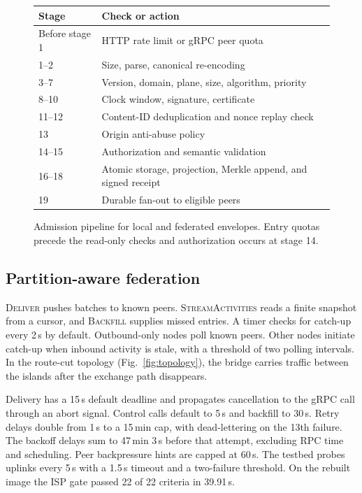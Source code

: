 \documentclass[conference,a4paper,10pt]{IEEEtran}
\begin{document}
\begin{figure}[!t]
  \centering
  {\normalsize
  \begin{tabularx}{\columnwidth}{@{}l>{\raggedright\arraybackslash}X@{}}
    \toprule
    \textbf{Stage} & \textbf{Check or action} \\
    \midrule
    Before stage 1 & HTTP rate limit or gRPC peer quota \\
    \midrule
    1--2 & Size, parse, canonical re-encoding \\
    3--7 & Version, domain, plane, size, algorithm, priority \\
    8--10 & Clock window, signature, certificate \\
    11--12 & Content-ID deduplication and nonce replay check \\
    \midrule
    13 & Origin anti-abuse policy \\
    14--15 & Authorization and semantic validation \\
    16--18 & Atomic storage, projection, Merkle append, and signed receipt \\
    19 & Durable fan-out to eligible peers \\
    \bottomrule
  \end{tabularx}}
  \caption{Admission pipeline for local and federated envelopes. Entry quotas precede the read-only checks and authorization occurs at stage 14.}
  \label{fig:pipeline}
\end{figure}

\subsection{Partition-aware federation}

\textsc{Deliver} pushes batches to known peers. \textsc{StreamActivities} reads a finite snapshot from a cursor, and \textsc{Backfill} supplies missed entries. A timer checks for catch-up every 2\,s by default. Outbound-only nodes poll known peers. Other nodes initiate catch-up when inbound activity is stale, with a threshold of two polling intervals. In the route-cut topology (Fig.~\ref{fig:topology}), the bridge carries traffic between the islands after the exchange path disappears.

Delivery has a 15\,s default deadline and propagates cancellation to the gRPC call through an abort signal. Control calls default to 5\,s and backfill to 30\,s. Retry delays double from 1\,s to a 15\,min cap, with dead-lettering on the 13th failure. The backoff delays sum to 47\,min 3\,s before that attempt, excluding RPC time and scheduling. Peer backpressure hints are capped at 60\,s. The testbed probes uplinks every 5\,s with a 1.5\,s timeout and a two-failure threshold. On the rebuilt image the ISP gate passed 22 of 22 criteria in 39.91\,s.
\end{document}
